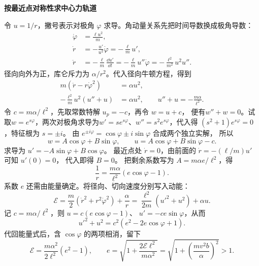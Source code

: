 \begin{solution}
\par\medskip{}\noindent\textbf{按最近点对称性求中心力轨道}\par\nobreak
令 $u=1/r$，撇号表示对极角 $\varphi$ 求导。角动量关系先把时间导数换成极角导数：
\[
\begin{aligned}
 \dot\varphi&=\frac{\ell u^2}{m},\\
 \dot r&=-\frac{u'}{u^2}\dot\varphi=-\frac\ell m u',\\
 \ddot r&=-\frac\ell m\frac{\dd u'}{\dd t}
 =-\frac\ell m u''\dot\varphi
 =-\frac{\ell^2}{m^2}u^2u''.
\end{aligned}
\]
径向向外为正，库仑斥力为 $\alpha/r^2$。代入径向牛顿方程，得到
\begin{align*}
 m(\ddot r-r\dot\varphi^2)&=\alpha u^2,\\
 -\frac{\ell^2}{m}u^2(u''+u)&=\alpha u^2,
 \qquad u''+u=-\frac{m\alpha}{\ell^2}.
\end{align*}
令 $c=m\alpha/\ell^2$，先取常数特解 $u_p=-c$，再令 $w=u+c$，
便有$w''+w=0$。试取$w=e^{s\varphi}$，两次对极角求导为$w'=se^{s\varphi}$、$w''=s^2e^{s\varphi}$，代入得
$(s^2+1)e^{s\varphi}=0$，特征根为 $s=\pm i$。
由 $e^{\pm i\varphi}=\cos\varphi\pm i\sin\varphi$ 合成两个独立实解，
所以
\[
 w=A\cos\varphi+B\sin\varphi,\qquad
 u=A\cos\varphi+B\sin\varphi-c.
\]
求导为 $u'=-A\sin\varphi+B\cos\varphi$。
最近点处 $\dot r=0$，由前面的 $\dot r=-(\ell/m)u'$ 可知 $u'(0)=0$，
代入即得 $B=0$。
把剩余系数写为 $A=m\alpha e/\ell^2$，得
\[
 \frac1r=\frac{m\alpha}{\ell^2}(e\cos\varphi-1).
\]
系数 $e$ 还需由能量确定。将径向、切向速度分别写入动能：
\[
 \mathcal E=\frac m2(\dot r^2+r^2\dot\varphi^2)+\frac\alpha r
 =\frac{\ell^2}{2m}(u'^2+u^2)+\alpha u.
\]
记 $c=m\alpha/\ell^2$，则 $u=c(e\cos\varphi-1)$、
$u'=-ce\sin\varphi$，从而
\[
 u'^2+u^2=c^2(e^2-2e\cos\varphi+1).
\]
代回能量式后，含 $\cos\varphi$ 的两项相消，留下
\[
 \mathcal E=\frac{m\alpha^2}{2\ell^2}(e^2-1),\qquad
 e=\sqrt{1+\frac{2\mathcal E\ell^2}{m\alpha^2}}
 =\sqrt{1+\left(\frac{mv^2b}{\alpha}\right)^2}>1.
\]
\end{solution}
